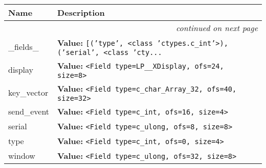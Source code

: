     \vspace{-1cm}
\hspace{\varindent}\begin{longtable}{|p{\varnamewidth}|p{\vardescrwidth}|l}
\cline{1-2}
\cline{1-2} \centering \textbf{Name} & \centering \textbf{Description}& \\
\cline{1-2}
\endhead\cline{1-2}\multicolumn{3}{r}{\small\textit{continued on next page}}\\\endfoot\cline{1-2}
\endlastfoot\raggedright \_\-f\-i\-e\-l\-d\-s\-\_\- & \raggedright \textbf{Value:} 
{\tt \texttt{[}\texttt{(}\texttt{'}\texttt{type}\texttt{'}\texttt{, }{\textless}class 'ctypes.c\_int'{\textgreater}\texttt{)}\texttt{, }\texttt{(}\texttt{'}\texttt{serial}\texttt{'}\texttt{, }{\textless}class 'cty\texttt{...}}&\\
\cline{1-2}
\raggedright d\-i\-s\-p\-l\-a\-y\- & \raggedright \textbf{Value:} 
{\tt {\textless}Field type=LP\_\_XDisplay, ofs=24, size=8{\textgreater}}&\\
\cline{1-2}
\raggedright k\-e\-y\-\_\-v\-e\-c\-t\-o\-r\- & \raggedright \textbf{Value:} 
{\tt {\textless}Field type=c\_char\_Array\_32, ofs=40, size=32{\textgreater}}&\\
\cline{1-2}
\raggedright s\-e\-n\-d\-\_\-e\-v\-e\-n\-t\- & \raggedright \textbf{Value:} 
{\tt {\textless}Field type=c\_int, ofs=16, size=4{\textgreater}}&\\
\cline{1-2}
\raggedright s\-e\-r\-i\-a\-l\- & \raggedright \textbf{Value:} 
{\tt {\textless}Field type=c\_ulong, ofs=8, size=8{\textgreater}}&\\
\cline{1-2}
\raggedright t\-y\-p\-e\- & \raggedright \textbf{Value:} 
{\tt {\textless}Field type=c\_int, ofs=0, size=4{\textgreater}}&\\
\cline{1-2}
\raggedright w\-i\-n\-d\-o\-w\- & \raggedright \textbf{Value:} 
{\tt {\textless}Field type=c\_ulong, ofs=32, size=8{\textgreater}}&\\
\cline{1-2}
\end{longtable}




